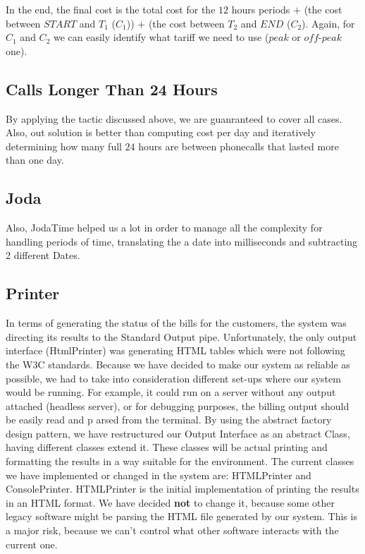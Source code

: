 \documentclass[11pt,twocolumn]{article} %
\begin{document}
In the end, the final cost is the total cost for the $12$ hours periods $+$ (the cost between $START$ and $T_1$ ($C_1$)) $+$ (the cost between $T_2$ and $END$ ($C_2$). 
Again, for $C_1$ and $C_2$ we can easily identify what tariff we need to use ($peak$ or $off$-$peak$ one).

\subsection{Calls Longer Than 24 Hours}
By applying the tactic discussed above, we are guanranteed to cover all cases. Also, out solution is better than computing cost per day
and iteratively determining how many full $24$ hours are between phonecalls that lasted more than one day.


\subsection{Joda}
Also, JodaTime helped us a lot in order to manage all the complexity for handling periods of time,
translating the a date into milliseconds and subtracting 2 different Dates. 

\subsection{Printer}
In terms of generating the status of the bills for the customers, the system was directing its results to the Standard Output pipe. 
Unfortunately, the only output interface (HtmlPrinter) was generating HTML tables which were not following the W3C standards. 
Because we have decided to make our system as reliable as possible, we had to take into consideration different set-ups where our system would be running. 
For example, it could run on a server without any output attached (headless server), or for debugging purposes, 
the billing output should be easily read and p arsed from the terminal. 
By using the abstract factory design pattern, we have restructured our Output Interface as an abstract Class, 
having different classes extend it. These classes will be actual printing and formatting the results in a way suitable for the environment.
The current classes we have implemented or changed in the system are: HTMLPrinter and ConsolePrinter. HTMLPrinter is the initial implementation 
of printing the results in an HTML format. We have decided \textbf{not} to change it, because some other legacy software might be parsing the
HTML file generated by our system. This is a major risk, because we can't control what other software interacts with the current one.
\end{document}
